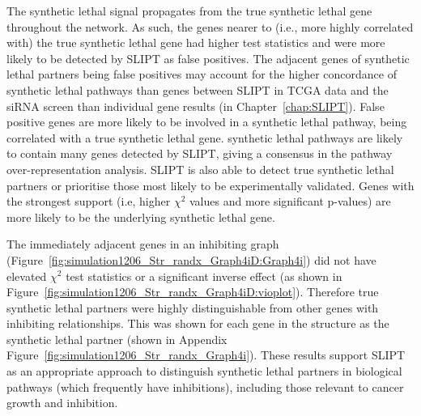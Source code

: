 The \gls{synthetic lethal} signal propagates from the true \gls{synthetic lethal} gene throughout the network. As such, the genes nearer to (i.e., more highly correlated with) the true \gls{synthetic lethal} gene had higher test statistics and were more likely to be detected by \gls{SLIPT} as false positives. The adjacent genes of \gls{synthetic lethal} partners being false positives may account for the higher concordance of \gls{synthetic lethal} pathways than genes between \gls{SLIPT} in \gls{TCGA} data \citep{TCGA2012} and the \gls{siRNA} screen \citep{Telford2015} than individual gene results (in Chapter~\ref{chap:SLIPT}). False positive genes are more likely to be involved in a \gls{synthetic lethal} pathway, being correlated with a true \gls{synthetic lethal} gene. \Gls{synthetic lethal} pathways are likely to contain many genes detected by \gls{SLIPT}, giving a consensus in the pathway over-representation analysis. \Gls{SLIPT} is also able to detect true \gls{synthetic lethal} partners or prioritise those most likely to be experimentally validated. Genes with the strongest support (i.e, higher $\chi^2$ values and more significant p-values) are more likely to be the underlying \gls{synthetic lethal} gene.

The immediately adjacent genes in an inhibiting graph (Figure~\ref{fig:simulation1206_Str_randx_Graph4iD:Graph4i}) did not have elevated $\chi^2$ test statistics or a significant inverse effect (as shown in Figure~\ref{fig:simulation1206_Str_randx_Graph4iD:vioplot}). 
Therefore true \gls{synthetic lethal} partners were highly distinguishable from other genes with inhibiting relationships. This was shown for each gene in the  structure as the \gls{synthetic lethal} partner (shown in Appendix Figure~\ref{fig:simulation1206_Str_randx_Graph4i}). 
These results support \gls{SLIPT} as an appropriate approach to distinguish \gls{synthetic lethal} partners in biological pathways (which frequently have inhibitions), including those relevant to cancer growth and inhibition.
%

